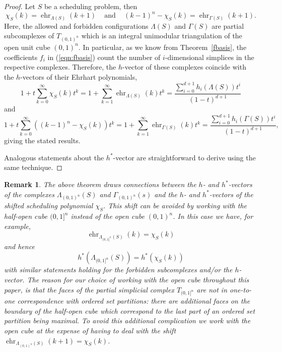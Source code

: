 \documentclass[12pt,reqno]{amsart}
\numberwithin{definition}{section}
\newtheorem{remark}[definition]{Remark}
\theoremstyle{definition}
\newcommand{\ehr}{\operatorname{ehr}}
\newcommand{\T}{T} %
\newcommand{\TC}{\T_{(0,1)^n}} %
\newcommand{\allow}{\Lambda} %
\newcommand{\poly}{\chi} %
\newcommand{\forb}{\Gamma} %
\newcommand{\allowC}{\allow_{(0,1)^n}} %
\newcommand{\forbC}{\forb_{(0,1)^n}} %
\begin{document}
\begin{proof}
Let $S$ be a scheduling problem, then
\[
  \poly_S(k) = \ehr_{\allow(S)}(k+1) \;\;\; \text{ and } \;\;\; (k-1)^n - \poly_{S}(k) = \ehr_{\forb(S)}(k+1).
\]
Here, the allowed and forbidden configurations $\allow(S)$ and $\forb(S)$ are partial subcomplexes of $\TC$ which is an integral unimodular triangulation of the open unit cube $(0,1)^n$.  In particular, as we know from Theorem~\ref{fbasis}, the coefficients $f_i$ in (\ref{eqn:fbasis}) count the number of $i$-dimensional simplices in the respective complexes. Therefore, the $h$-vector of these complexes coincide with the $h$-vectors of their Ehrhart polynomials,
\[
 1 + t\sum_{k = 0}^\infty \poly_S(k) t^k =  1 + \sum_{k = 1}^\infty \ehr_{\allow(S)}(k) t^k = \frac{\sum_{i=0}^{d+1} h_i(\allow(S)) t^i}{(1-t)^{d+1}}
\]
and
\[
 1 + t\sum_{k = 0}^\infty \left( (k-1)^n - \poly_S(k) \right) t^k =  1 + \sum_{k = 1}^\infty \ehr_{\forb(S)}(k) t^k = \frac{\sum_{i=0}^{d+1} h_i(\forb(S)) t^i}{(1-t)^{d+1}},
\]
giving the stated results.

 Analogous statements about the $h^*$-vector are straightforward to derive using the same technique.


\end{proof}

\begin{remark}
The above theorem draws connections between the $h$- and $h^*$-vectors of the complexes $\allowC(S)$ and $\forbC(s)$ and the $h$- and $h^*$-vectors of the \emph{shifted} scheduling polynomial $\poly_S$. This shift can be avoided by working with the half-open cube $(0,1]^n$ instead of the open cube $(0,1)^n$. In this case we have, for example,
\[
  \ehr_{\allow_{(0,1]^n}(S)}(k) = \poly_S(k)
\]
and hence
\[
  h^*(\allow_{(0,1]^n}(S)) = h^*(\poly_S(k))
\]
with similar statements holding for the forbidden subcomplexes and/or the $h$-vector. The reason for our choice of working with the open cube throughout this paper, is that the faces of the partial simplicial complex $T_{(0,1]^n}$ are not in one-to-one correspondence with ordered set partitions: there are additional faces on the boundary of the half-open cube which correspond to the last part of an ordered set partition being maximal. To avoid this additional complication we work with the open cube at the expense of having to deal with the shift $\ehr_{\allow_{(0,1)^n}(S)}(k+1) = \poly_S(k)$.
\end{remark}
\end{document}
